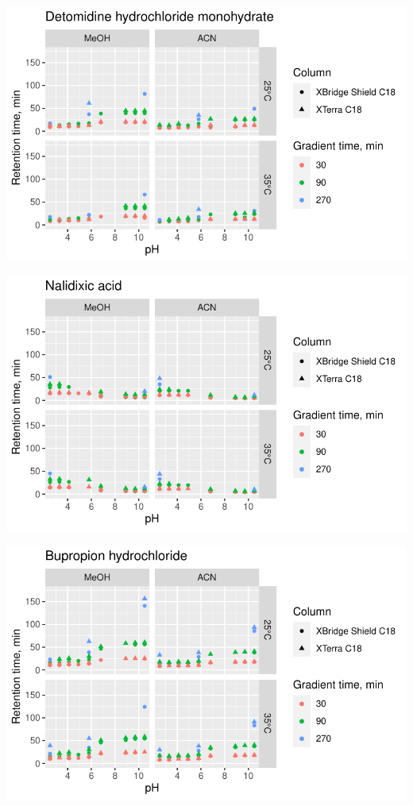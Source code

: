 \documentclass[
  letterpaper,
  DIV=11,
  numbers=noendperiod]{scrreprt}
\begin{document}
\includegraphics{index_files/figure-pdf/unnamed-chunk-4-114.pdf}

\includegraphics{index_files/figure-pdf/unnamed-chunk-4-115.pdf}

\includegraphics{index_files/figure-pdf/unnamed-chunk-4-116.pdf}
\end{document}
